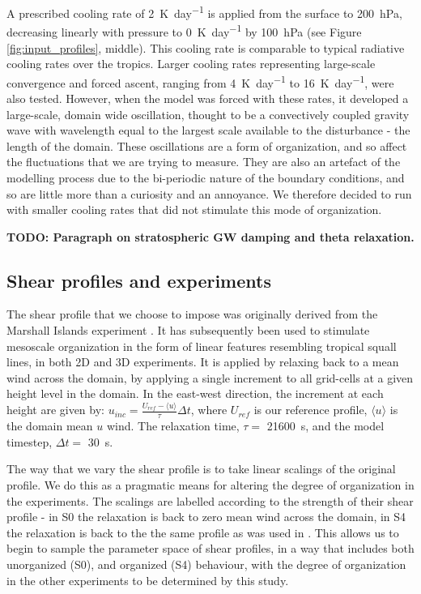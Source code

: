 \documentclass[11pt,a4paper]{article}
\newcommand\todo[1]{\textbf{TODO: #1}}
\begin{document}
A prescribed cooling rate of \SI{2}{K.day^{-1}} is applied from the surface to \SI{200}{hPa}, decreasing linearly with pressure to \SI{0}{K.day^{-1}} by \SI{100}{hPa} (see Figure \ref{fig:input_profiles}, middle). This cooling rate is comparable to typical radiative cooling rates over the tropics. Larger cooling rates representing large-scale convergence and forced ascent, ranging from \SI{4}{K.day^{-1}} to \SI{16}{K.day^{-1}}, were also tested. However, when the model was forced with these rates, it developed a large-scale, domain wide oscillation, thought to be a convectively coupled gravity wave with wavelength equal to the largest scale available to the disturbance - the length of the domain. These oscillations are a form of organization, and so affect the fluctuations that we are trying to measure. They are also an artefact of the modelling process due to the bi-periodic nature of the boundary conditions, and so are little more than a curiosity and an annoyance. We therefore decided to run with smaller cooling rates that did not stimulate this mode of organization.

\todo{Paragraph on stratospheric GW damping and theta relaxation.}

\subsection{Shear profiles and experiments}

The shear profile that we choose to impose was originally derived from the Marshall Islands experiment \parencite{yanai1973determination}. It has subsequently been used to stimulate mesoscale organization in the form of linear features resembling tropical squall lines, in both 2D \parencite{tompkins2000impact} and 3D \parencite{grabowski1996long, CC2006II} experiments. It is applied by relaxing back to a mean wind across the domain, by applying a single increment to all grid-cells at a given height level in the domain. In the east-west direction, the increment at each height are given by: $u_{inc} = \frac{U_{ref} - \langle u \rangle}{\tau} \Delta t$, where $U_{ref}$ is our reference profile, $\langle u \rangle$ is the domain mean $u$ wind. The relaxation time, $\tau = $ \SI{21600}{s}, and the model timestep, $\Delta t = $ \SI{30}{s}. 

The way that we vary the shear profile is to take linear scalings of the original profile. We do this as a pragmatic means for altering the degree of organization in the experiments. The scalings are labelled according to the strength of their shear profile - in S0 the relaxation is back to zero mean wind across the domain, in S4 the relaxation is back to the the same profile as was used in \cite{CC2006II, tompkins2000impact}. This allows us to begin to sample the parameter space of shear profiles, in a way that includes both unorganized (S0), and organized (S4) behaviour, with the degree of organization in the other experiments to be determined by this study.
\end{document}
